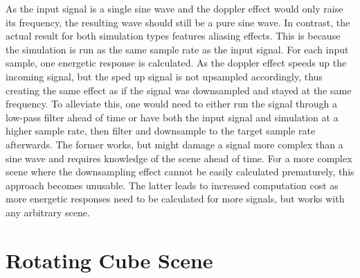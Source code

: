 As the input signal is a single sine wave and the doppler effect would only raise its frequency,
the resulting wave should still be a pure sine wave.
In contrast, the actual result for both simulation types features aliasing effects.
\newline
This is because the simulation is run as the same sample rate as the input signal.
For each input sample, one energetic response is calculated.
As the doppler effect speeds up the incoming signal,
but the sped up signal is not upsampled accordingly,
thus creating the same effect as if the signal was downsampled and stayed at the same frequency.
\newline
To alleviate this, one would need to either run the signal through a low-pass filter ahead of time
or have both the input signal and simulation at a higher sample rate,
then filter and downsample to the target sample rate afterwards.
\newline
The former works, but might damage a signal more complex than a sine wave
and requires knowledge of the scene ahead of time.
For a more complex scene where the downsampling effect cannot be easily calculated prematurely,
this approach becomes unusable.
\newline
The latter leads to increased computation cost as more energetic responses need to be calculated for more signals,
but works with any arbitrary scene.

\section{Rotating Cube Scene}

